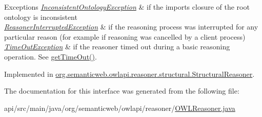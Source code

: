 \begin{DoxyExceptions}{Exceptions}
{\em \hyperlink{classorg_1_1semanticweb_1_1owlapi_1_1reasoner_1_1_inconsistent_ontology_exception}{Inconsistent\-Ontology\-Exception}} & if the imports closure of the root ontology is inconsistent \\
\hline
{\em \hyperlink{classorg_1_1semanticweb_1_1owlapi_1_1reasoner_1_1_reasoner_interrupted_exception}{Reasoner\-Interrupted\-Exception}} & if the reasoning process was interrupted for any particular reason (for example if reasoning was cancelled by a client process) \\
\hline
{\em \hyperlink{classorg_1_1semanticweb_1_1owlapi_1_1reasoner_1_1_time_out_exception}{Time\-Out\-Exception}} & if the reasoner timed out during a basic reasoning operation. See \hyperlink{interfaceorg_1_1semanticweb_1_1owlapi_1_1reasoner_1_1_o_w_l_reasoner_a44b2c968f989afe5290db29c90faa164}{get\-Time\-Out()}. \\
\hline
\end{DoxyExceptions}


Implemented in \hyperlink{classorg_1_1semanticweb_1_1owlapi_1_1reasoner_1_1structural_1_1_structural_reasoner_aa4ebe85aba9feb5ce15a83473fdddba5}{org.\-semanticweb.\-owlapi.\-reasoner.\-structural.\-Structural\-Reasoner}.



The documentation for this interface was generated from the following file\-:\begin{DoxyCompactItemize}
\item 
api/src/main/java/org/semanticweb/owlapi/reasoner/\hyperlink{_o_w_l_reasoner_8java}{O\-W\-L\-Reasoner.\-java}\end{DoxyCompactItemize}
